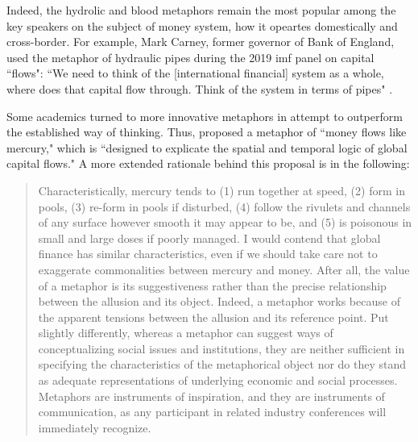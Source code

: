 Indeed, the hydrolic and blood metaphors remain the most popular among the key speakers on the subject of money system, how it opeartes domestically and cross-border. For example, Mark Carney, former governor of Bank of England, used the metaphor of hydraulic pipes during the 2019 \ac{imf} panel on capital ``flows": ``We need to think of the [international financial] system as a whole, where does that capital flow through. Think of the system in terms of pipes" \citep{imf2019}. 

Some academics turned to more innovative metaphors in attempt to outperform the established way of thinking. Thus, \cite{clark2005} proposed a metaphor of ``money flows like mercury," which is ``designed to explicate the spatial and temporal logic of global capital flows." A more extended rationale behind this proposal is in the following: 

\begin{quote}
Characteristically, mercury tends to (1) run together at speed, (2) form in pools, (3) re-form in pools if disturbed, (4) follow the rivulets and channels of any surface however smooth it may appear to be, and (5) is poisonous in small and large doses if poorly managed. I would contend that global finance has similar characteristics, even if we should take care not to exaggerate commonalities between mercury and money. After all, the value of a metaphor is its suggestiveness rather than the precise relationship between the allusion and its object. Indeed, a metaphor works because of the apparent tensions between the allusion and its reference point. Put slightly differently, whereas a metaphor can suggest ways of conceptualizing social issues and institutions, they are neither sufficient in specifying the characteristics of the metaphorical object nor do they stand as adequate representations of underlying economic and social processes. Metaphors are instruments of inspiration, and they are instruments of communication, as any participant in related industry conferences will immediately recognize. \citep[p.~105]{clark2005}
\end{quote}

